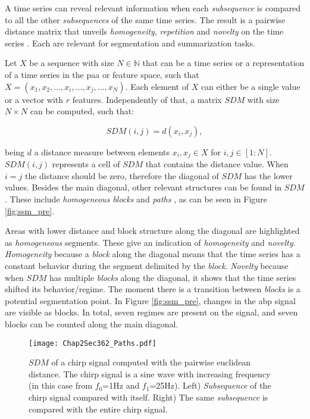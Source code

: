 A time series can reveal relevant information when each \textit{subsequence} is compared to all the other \textit{subsequences} of the same time series. The result is a pairwise distance matrix that unveils \textit{homogeneity}, \textit{repetition} and \textit{novelty} on the time series \cite{fmp1}. Each are relevant for segmentation and summarization tasks.

Let $X$ be a sequence with size $N \in \mathbb{N}$ that can be a time series or a representation of a time series in the \gls{paa} or feature space, such that $X = (x_1, x_2, ..., x_i, ..., x_j, ..., x_N)$. Each element of $X$ can either be a single value or a vector with $r$ features. Independently of that, a matrix $SDM$ with size $N \times N$ can be computed, such that:

\begin{equation}
\label{eq:sdm}
SDM(i,j)= d(x_i, x_j),
\end{equation}

being $d$ a distance measure between elements $x_i, x_j \in X$ for $i, j \in [1:N]$. $SDM(i,j)$ represents a cell of $SDM$ that contains the distance value. When $i=j$ the distance should be zero, therefore the diagonal of $SDM$ has the lower values. Besides the main diagonal, other relevant structures can be found in $SDM$. These include \textit{homogeneous blocks} and \textit{paths} \cite{fmp1, fmp2}, as can be seen in Figure \ref{fig:ssm_pre}.

Areas with lower distance and block structure along the diagonal are highlighted as \textit{homogeneous} segments. These give an indication of \textit{homogeneity} and \textit{novelty}. \textit{Homogeneity} because a \textit{block} along the diagonal means that the time series has a constant behavior during the segment delimited by the \textit{block}. \textit{Novelty} because when $SDM$ has multiple \textit{blocks} along the diagonal, it shows that the time series shifted its behavior/regime. The moment there is a transition between \textit{blocks} is a potential segmentation point. In Figure \ref{fig:ssm_pre}, changes in the \gls{abp} signal are visible as blocks. In total, seven regimes are present on the signal, and seven blocks can be counted along the main diagonal.

\begin{figure}
\centering
\texttt{[image: Chap2Sec362\_Paths.pdf]}
\caption{$SDM$ of a chirp signal computed with the pairwise euclidean distance. The chirp signal is a sine wave with increasing frequency (in this case from $f_0$=1Hz and $f_1$=25Hz)\cite{scipy}. Left) \textit{Subsequence} of the chirp signal compared with itself. Right) The same \textit{subsequence} is compared with the entire chirp signal.}
\label{fig:sdm_periods}
\end{figure}


